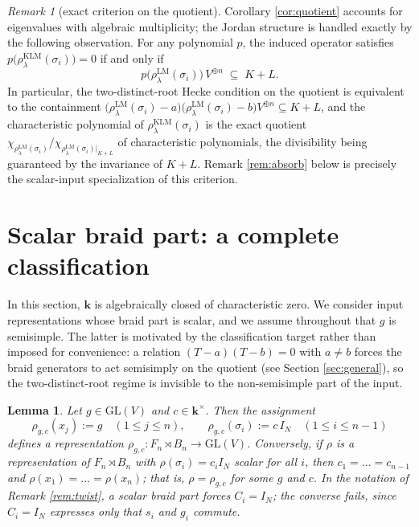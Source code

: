 \documentclass[11pt]{article}
\newtheorem{lemma}[theorem]{Lemma}
\theoremstyle{definition}
\theoremstyle{remark}
\newtheorem{remark}[theorem]{Remark}
\newcommand{\GL}{\mathrm{GL}}
\newcommand{\kk}{\boldsymbol{k}}
\newcommand{\rLMl}{\rho^{\mathrm{LM}}_{\lambda}}
\newcommand{\rKLM}{\rho^{\mathrm{KLM}}_{\lambda}}
\begin{document}
\begin{remark}[exact criterion on the quotient]\label{rem:exact}
Corollary \ref{cor:quotient} accounts for eigenvalues with algebraic
multiplicity; the Jordan structure is handled exactly by the following
observation. For any polynomial $p$, the induced operator satisfies
$p\bigl(\rKLM(\sigma_i)\bigr) = 0$ if and only if
\[
p\bigl(\rLMl(\sigma_i)\bigr)\, V^{\oplus n} \;\subseteq\; K + L .
\]
In particular, the two-distinct-root Hecke condition on the quotient is
equivalent to the containment
$\bigl(\rLMl(\sigma_i) - a\bigr)\bigl(\rLMl(\sigma_i) - b\bigr)
V^{\oplus n} \subseteq K + L$, and the characteristic polynomial of
$\rKLM(\sigma_i)$ is the exact quotient
$\chi_{\rLMl(\sigma_i)} \big/ \chi_{\rLMl(\sigma_i)|_{K+L}}$ of
characteristic polynomials, the divisibility being guaranteed by the
invariance of $K + L$. Remark \ref{rem:absorb} below is precisely the
scalar-input specialization of this criterion.
\end{remark}

\section{Scalar braid part: a complete classification}\label{sec:hecke}

In this section, $\kk$ is algebraically closed of characteristic zero.
We consider input representations whose braid part is scalar, and we
assume throughout that $g$ is semisimple. The latter is motivated by
the classification target rather than imposed for convenience: a
relation $(T - a)(T - b) = 0$ with $a \neq b$ forces the braid
generators to act semisimply on the quotient (see Section
\ref{sec:general}), so the two-distinct-root regime is invisible to the
non-semisimple part of the input.

\begin{lemma}\label{lem:scalarrep}
Let $g \in \GL(V)$ and $c \in \kk^{\times}$. Then the assignment
\[
\rho_{g,c}(x_j) := g \quad (1 \le j \le n), \qquad
\rho_{g,c}(\sigma_i) := c\, I_N \quad (1 \le i \le n-1)
\]
defines a representation
$\rho_{g,c} \colon F_n \rtimes B_n \to \GL(V)$.
Conversely, if $\rho$ is a representation of $F_n \rtimes B_n$ with
$\rho(\sigma_i) = c_i I_N$ scalar for all $i$, then $c_1 = \dots = c_{n-1}$
and $\rho(x_1) = \dots = \rho(x_n)$; that is, $\rho = \rho_{g,c}$ for some
$g$ and $c$. In the notation of Remark \ref{rem:twist}, a scalar braid
part forces $C_i = I_N$; the converse fails, since $C_i = I_N$ expresses
only that $s_i$ and $g_i$ commute.
\end{lemma}
\end{document}
